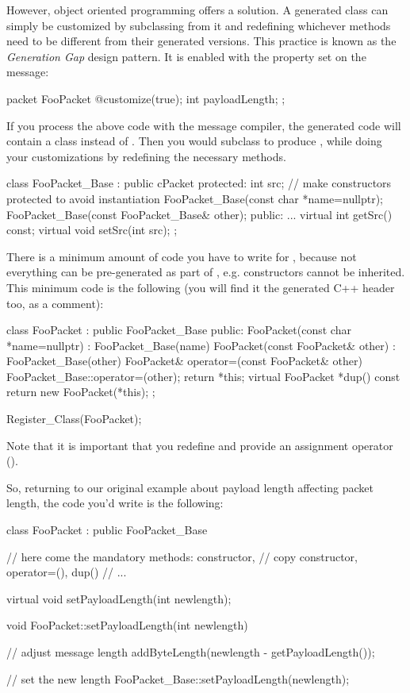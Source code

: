However, object oriented programming offers a solution.
A generated class can simply be customized by subclassing
from it and redefining whichever methods need to be
different from their generated versions. This practice
is known as the \textit{Generation Gap} design pattern.
It is enabled with the  property set on the
message:

\begin{msg}
packet FooPacket
{
   @customize(true);
   int payloadLength;
};
\end{msg}

If you process the above code with the message compiler,
the generated code will contain a  class
instead of . Then you would subclass
 to produce ,
while doing your customizations by redefining the necessary methods.

\begin{cpp}
class FooPacket_Base : public cPacket
{
  protected:
    int src;
    // make constructors protected to avoid instantiation
    FooPacket_Base(const char *name=nullptr);
    FooPacket_Base(const FooPacket_Base& other);
  public:
    ...
    virtual int getSrc() const;
    virtual void setSrc(int src);
};
\end{cpp}

There is a minimum amount of code you have to write
for , because not everything can be
pre-generated as part of , e.g.
constructors cannot be inherited. This minimum
code is the following (you will find it the generated C++ header
too, as a comment):

\begin{cpp}
class FooPacket : public FooPacket_Base
{
  public:
    FooPacket(const char *name=nullptr) : FooPacket_Base(name) {}
    FooPacket(const FooPacket& other) : FooPacket_Base(other) {}
    FooPacket& operator=(const FooPacket& other)
        {FooPacket_Base::operator=(other); return *this;}
    virtual FooPacket *dup() const {return new FooPacket(*this);}
};

Register_Class(FooPacket);
\end{cpp}

Note that it is important that you redefine  and
provide an assignment operator ().

So, returning to our original example about payload length
affecting packet length, the code you'd write is the following:

\begin{cpp}
class FooPacket : public FooPacket_Base
{
    // here come the mandatory methods: constructor,
    // copy constructor, operator=(), dup()
    // ...

    virtual void setPayloadLength(int newlength);
}

void FooPacket::setPayloadLength(int newlength)
{
    // adjust message length
    addByteLength(newlength - getPayloadLength());

    // set the new length
    FooPacket_Base::setPayloadLength(newlength);
}
\end{cpp}



